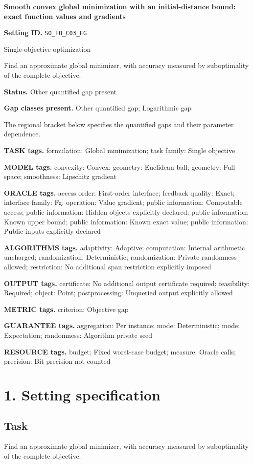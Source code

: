 \documentclass[10pt,a4paper]{article}
\begin{document}
\raggedright

{\LARGE\bfseries\sffamily\color{AtlasNavy} Smooth convex global minimization with an initial-distance bound: exact function values and gradients\par}\vspace{5pt}
\textbf{Setting ID.} \texttt{SO\_\allowbreak{}FO\_\allowbreak{}C03\_\allowbreak{}FG}

Single-objective optimization

Find an approximate global minimizer, with accuracy measured by suboptimality of the complete objective.

\textbf{Status.} Other quantified gap present

\textbf{Gap classes present.} Other quantified gap; Logarithmic gap

The regional bracket below specifies the quantified gaps and their parameter dependence.

\textbf{TASK tags.} formulation: Global minimization; task family: Single objective

\textbf{MODEL tags.} convexity: Convex; geometry: Euclidean ball; geometry: Full space; smoothness: Lipschitz gradient

\textbf{ORACLE tags.} access order: First-order interface; feedback quality: Exact; interface family: Fg; operation: Value gradient; public information: Computable access; public information: Hidden objects explicitly declared; public information: Known upper bound; public information: Known exact value; public information: Public inputs explicitly declared

\textbf{ALGORITHMS tags.} adaptivity: Adaptive; computation: Internal arithmetic uncharged; randomization: Deterministic; randomization: Private randomness allowed; restriction: No additional span restriction explicitly imposed

\textbf{OUTPUT tags.} certificate: No additional output certificate required; feasibility: Required; object: Point; postprocessing: Unqueried output explicitly allowed

\textbf{METRIC tags.} criterion: Objective gap

\textbf{GUARANTEE tags.} aggregation: Per instance; mode: Deterministic; mode: Expectation; randomness: Algorithm private seed

\textbf{RESOURCE tags.} budget: Fixed worst-case budget; measure: Oracle calls; precision: Bit precision not counted

\section{1. Setting specification}
\subsection{Task}
Find an approximate global minimizer, with accuracy measured by suboptimality of the complete objective.
\end{document}
